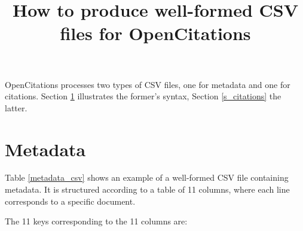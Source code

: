 \documentclass{article}
\title{How to produce well-formed CSV files for OpenCitations}
\date{}
\author{}
\begin{document}
\maketitle

OpenCitations processes two types of CSV files, one for metadata and one for citations. Section \ref{s_metadata} illustrates the former's syntax, Section \ref{s_citations} the latter.

\section{Metadata}\label{s_metadata}

Table \ref{metadata_csv} shows an example of a well-formed CSV file containing metadata. It is structured according to a table of 11 columns, where each line corresponds to a specific document.

The 11 keys corresponding to the 11 columns are:
\end{document}
